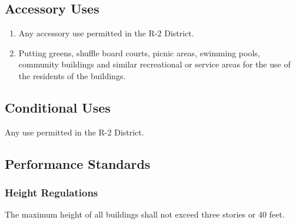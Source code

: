 \subsection{Accessory Uses}
\begin{enumerate}[{\indent}1)]
    \item Any accessory use permitted in the R-2 District.
    \item Putting greens, shuffle board courts, picnic areas, swimming pools, community buildings and similar recreational or service areas for the use of the residents of the buildings.
\end{enumerate}
\subsection{Conditional Uses}
Any use permitted in the R-2 District.
\subsection{Performance Standards}
\subsubsection{Height Regulations}
The maximum height of all buildings shall not exceed three stories or 40 feet.
